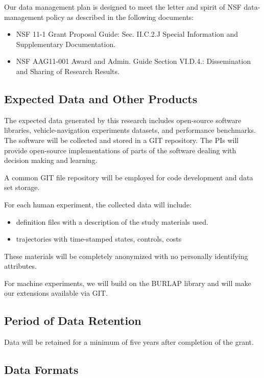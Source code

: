 Our data management plan is designed to meet the letter and spirit of
NSF data-management policy as described in the following documents:
\begin{itemize}
\item NSF 11-1 Grant Proposal Guide: Sec. II.C.2.J Special Information
   and Supplementary Documentation.
\item NSF AAG11-001 Award and Admin. Guide Section VI.D.4.: Dissemination
   and Sharing of Research Results.
\end{itemize}

\subsection*{Expected Data and Other Products}

The expected data generated by this research includes open-source
software libraries, vehicle-navigation experiments datasets, and
performance benchmarks. The software will be collected and stored in a
GIT repository.  The PIs will provide open-source implementations of
parts of the software dealing with decision making and learning.

A common GIT file repository will be employed for code development and
data set storage.

For each human experiment, the collected data will include:
\begin{itemize}
\item definition files with a description of the study materials used.
\item trajectories with time-stamped states, controls, costs
\end{itemize}

These materials will be completely anonymized with no personally
identifying attributes.

For machine experiments, we will build on the BURLAP library and will
make our extensions available via GIT.

\subsection*{Period of Data Retention}

Data will be retained for a minimum of five years after completion of
the grant.

\subsection*{Data Formats}

